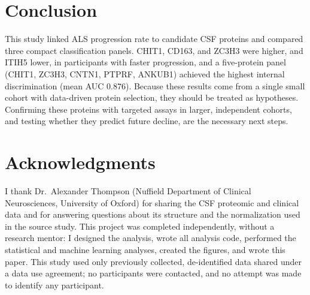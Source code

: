 \documentclass[11pt,letterpaper]{article}
\begin{document}
\section{Conclusion}

This study linked ALS progression rate to candidate CSF proteins and compared three compact classification panels. CHIT1, CD163, and ZC3H3 were higher, and ITIH5 lower, in participants with faster progression, and a five-protein panel (CHIT1, ZC3H3, CNTN1, PTPRF, ANKUB1) achieved the highest internal discrimination (mean AUC 0.876). Because these results come from a single small cohort with data-driven protein selection, they should be treated as hypotheses. Confirming these proteins with targeted assays in larger, independent cohorts, and testing whether they predict future decline, are the necessary next steps.

\section*{Acknowledgments}

I thank Dr.\ Alexander Thompson (Nuffield Department of Clinical Neurosciences, University of Oxford) for sharing the CSF proteomic and clinical data and for answering questions about its structure and the normalization used in the source study. This project was completed independently, without a research mentor: I designed the analysis, wrote all analysis code, performed the statistical and machine learning analyses, created the figures, and wrote this paper. This study used only previously collected, de-identified data shared under a data use agreement; no participants were contacted, and no attempt was made to identify any participant.



\end{document}

